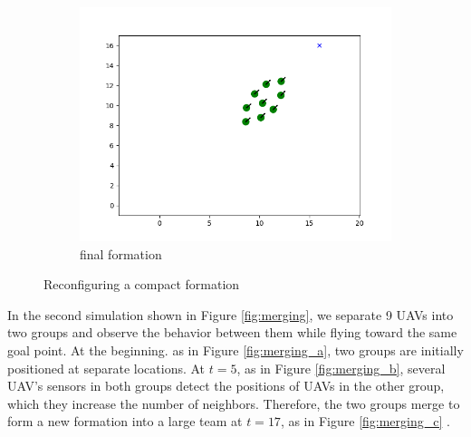 \begin{figure}[htbp]
\begin{subfigure}[b]{0.3\textwidth}
         \centering
         \includegraphics[width=\textwidth]{figures/reconfigure_3.png}
         \caption{final formation}
         \label{reconfiguring_c}
     \end{subfigure}
        \caption{Reconfiguring a compact formation}
        \label{reconfiguring}
\end{figure}


In the second simulation shown in Figure \ref{fig:merging}, we separate 9 UAVs into two groups and observe the behavior between them while flying toward the same goal point. At the beginning. as in Figure \ref{fig:merging_a}, two groups are initially positioned at separate locations. At $t=5$, as in Figure \ref{fig:merging_b}, several UAV's sensors in both groups detect the positions of UAVs in the other group, which they increase the number of neighbors. Therefore, the two groups merge to form a new formation into a large team at $t=17$, as in Figure \ref{fig:merging_c} . 

